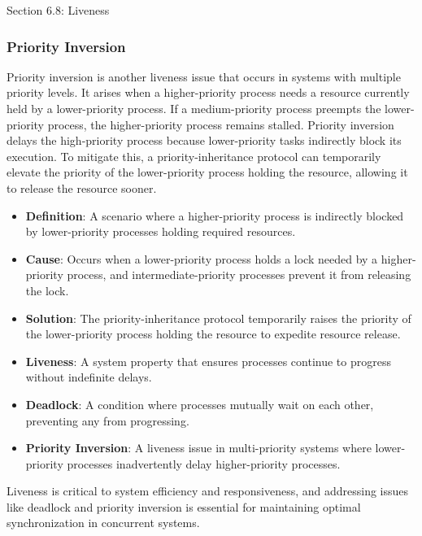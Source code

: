 \begin{notes}{Section 6.8: Liveness}
\begin{highlight}[Deadlock]
    \end{highlight}
    
    \subsubsection*{Priority Inversion}
    
    Priority inversion is another liveness issue that occurs in systems with multiple priority levels. It arises when a higher-priority process needs a resource currently held by a lower-priority process. 
    If a medium-priority process preempts the lower-priority process, the higher-priority process remains stalled. Priority inversion delays the high-priority process because lower-priority tasks 
    indirectly block its execution. To mitigate this, a priority-inheritance protocol can temporarily elevate the priority of the lower-priority process holding the resource, allowing it to release the resource sooner.
    
    \begin{highlight}
    
        \begin{itemize}
            \item \textbf{Definition}: A scenario where a higher-priority process is indirectly blocked by lower-priority processes holding required resources.
            \item \textbf{Cause}: Occurs when a lower-priority process holds a lock needed by a higher-priority process, and intermediate-priority processes prevent it from releasing the lock.
            \item \textbf{Solution}: The priority-inheritance protocol temporarily raises the priority of the lower-priority process holding the resource to expedite resource release.
        \end{itemize}
    
    \end{highlight}
    
    \begin{highlight}
    
        \begin{itemize}
            \item \textbf{Liveness}: A system property that ensures processes continue to progress without indefinite delays.
            \item \textbf{Deadlock}: A condition where processes mutually wait on each other, preventing any from progressing.
            \item \textbf{Priority Inversion}: A liveness issue in multi-priority systems where lower-priority processes inadvertently delay higher-priority processes.
        \end{itemize}
    
    Liveness is critical to system efficiency and responsiveness, and addressing issues like deadlock and priority inversion is essential for maintaining optimal synchronization in concurrent systems.
    
    \end{highlight}
\end{notes}

